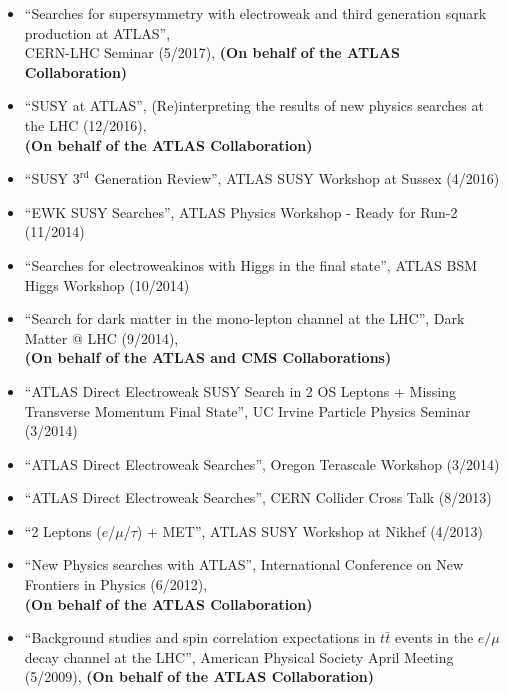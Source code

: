\documentclass[a4paper,10pt]{article}
\begin{document}
\begin{itemize}
	\item ``Searches for supersymmetry with electroweak and third generation squark production at ATLAS'', \\ CERN-LHC Seminar (5/2017), 
	{\bf (On behalf of the ATLAS Collaboration)}
	\item ``SUSY at ATLAS'', (Re)interpreting the results of new physics searches at the LHC (12/2016),
	\\ {\bf (On behalf of the ATLAS Collaboration)}
	\item ``SUSY $3^{\mathrm{rd}}$ Generation Review'', ATLAS SUSY Workshop at Sussex (4/2016)
	\item ``EWK SUSY Searches'', ATLAS Physics Workshop - Ready for Run-2  (11/2014)
	\item ``Searches for electroweakinos with Higgs in the final state'', ATLAS BSM Higgs Workshop (10/2014)
	\item  ``Search for dark matter in the mono-lepton channel at the LHC'', Dark Matter @ LHC (9/2014), 
	\\ {\bf (On behalf of the ATLAS and CMS Collaborations)}
	\item ``ATLAS Direct Electroweak SUSY Search in 2 OS Leptons + Missing Transverse Momentum Final State'', 
	UC Irvine Particle Physics Seminar (3/2014)
	\item ``ATLAS Direct Electroweak Searches'', Oregon Terascale Workshop (3/2014)
	\item ``ATLAS Direct Electroweak Searches'', CERN Collider Cross Talk (8/2013)
	\item ``2 Leptons ($e$/$\mu$/$\tau$) + MET'', ATLAS SUSY Workshop at Nikhef (4/2013)
	\item ``New Physics searches with ATLAS'', International Conference on New Frontiers in Physics (6/2012),
	\\ {\bf (On behalf of the ATLAS Collaboration)}
	\item ``Background studies and spin correlation expectations in $t\bar{t}$ events in the $e/\mu$ decay channel at the LHC'',
	American Physical Society April Meeting (5/2009), {\bf (On behalf of the ATLAS Collaboration)}
\end{itemize} 
\end{document}
